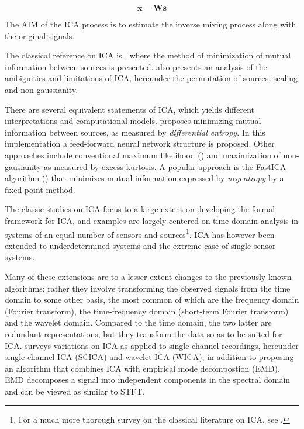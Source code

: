 \documentclass[11pt, oneside, a4paper]{article}
\begin{document}
\begin{equation}
  \mathbf{x} =   \mathbf{W}  \mathbf{s}
\end{equation}

The AIM of the ICA process is to estimate the inverse mixing process
along with the original signals.

The classical reference on ICA
is \cite{comon94}, where the method of minimization of mutual
information between sources is presented. \cite{comon94} also presents an
analysis of the ambiguities and limitations of ICA, hereunder the permutation of
sources, scaling and non-gaussianity. 

There are several equivalent statements of ICA, which yields different
interpretations and computational models.
\cite{bellSejnowski95} proposes minimizing mutual information between
sources, as measured by \emph{differential entropy}. In this
implementation a feed-forward neural network structure is proposed.
Other approaches include conventional maximum likelihood (\cite{pearlmutterParra}) and maximization of
non-gausianity as measured by excess kurtosis. A popular approach is
the  FastICA algorithm (\cite{fastICA}) that minimizes mutual
information expressed by \emph{negentropy} by a fixed point method. 

The classic studies on ICA focus to a large extent on developing the
formal framework for ICA, and examples are largely centered on time
domain analysis in systems of an equal number of sensors and
sources\footnote{For a much more thorough survey on the classical literature 
on ICA, see \cite{hyvarinen2001}.}. ICA has however been extended to underdetermined systems and
the extreme case of single sensor systems. 

Many of these extensions are to a lesser extent changes to the
previously known algorithms; rather they involve transforming
the observed signals from the time domain to some other basis, the
most common of which are the frequency domain (Fourier transform), the
time-frequency domain (short-term Fourier transform) and the wavelet
domain. Compared to the time domain, the two latter are redundant
representations, but they transform the data so as to be suited for
ICA. \cite{mijovic2010} surveys variations on ICA as applied to single
channel recordings, hereunder single channel ICA (SCICA) and wavelet
ICA (WICA), in addition to proposing an algorithm that combines ICA
with empirical mode decompostion (EMD). EMD decomposes a signal into
independent components in the spectral domain and can be viewed as
similar to STFT.
\end{document}
